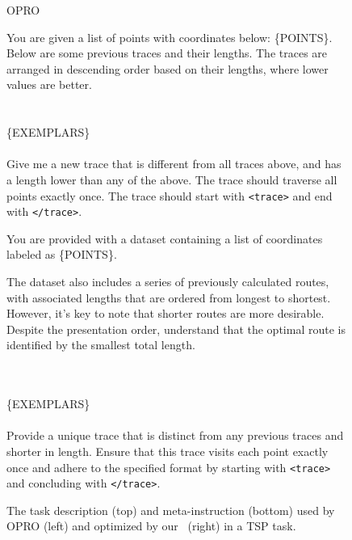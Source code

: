 \begin{figure*}[h]
\begin{minipage}[t]{0.4\textwidth}
\begin{mdframed}[linewidth=0.9pt]  %
\footnotesize  %
\centerline{{\normalsize  OPRO}}
    {\color{purple}You are given a list of points with coordinates below: \{POINTS\}.\\
    Below are some previous traces and their lengths. 
The traces are arranged in descending order based on their lengths, 
where lower values are better.} \\ \\ \\
    \{EXEMPLARS\}
    \\\\
    {\color{blue}Give me a new trace that is different from all traces above, 
and has a length lower than any of the above. 
The trace should traverse all points exactly once. 
The trace should start with \texttt{<trace>} and end with \texttt{</trace>}.}
\end{mdframed}
\end{minipage}
\hfill
\begin{minipage}[t]{0.59\textwidth}
\begin{mdframed}[linewidth=0.9pt]  %
    \footnotesize  %
\centerline{{\normalsize  \alg}}
    {\color{purple}You are provided with a dataset containing a list of coordinates labeled as \{POINTS\}. \par
The dataset also includes a series of previously calculated routes, with associated lengths that are ordered from longest to shortest. 
However, it’s key to note that shorter routes are more desirable. 
Despite the presentation order, understand that the optimal route is identified by the smallest total length.}  \\ \\
    \{EXEMPLARS\}
    \\\\
    {\color{blue}Provide a unique trace that is distinct from any previous traces and shorter in length. 
Ensure that this trace visits each point exactly once and adhere to the specified format 
by starting with \texttt{<trace>} and concluding with \texttt{</trace>}.} \\
\end{mdframed}
\end{minipage}
\caption{
The {\color{purple}task description} (top) and {\color{blue}meta-instruction} (bottom) used by OPRO (left) and optimized by our \alg~(right) in a TSP task.
}
\label{fig:example:descriptions:tsp}
\end{figure*}


